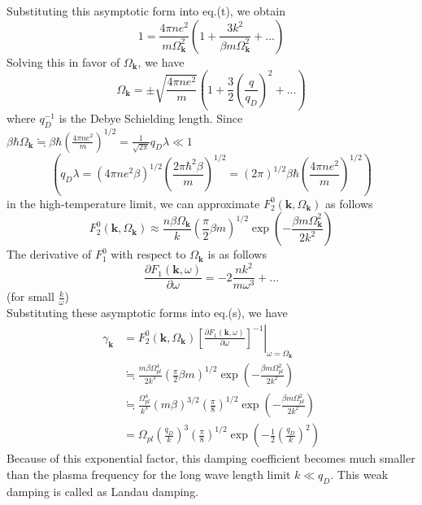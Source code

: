  Substituting this asymptotic form into eq.(t), we obtain
\begin{equation}
1=\frac{4\pi ne^2}{m\Omega_{\mathbf k}^2}\left( 1+\frac{3k^2}{\beta m\Omega_{\mathbf k}^2}+... \right)
\end{equation}
 Solving this in favor of $\Omega_{\mathbf k}$, we have 
\begin{equation}
\Omega_{\mathbf k}=\pm \sqrt{\frac{4\pi ne^2}{m}}\left( 1+\frac{3}{2}\left( \frac{q}{q_D} \right)^2+... \right)
\end{equation}
where $q_D^{-1}$ is the Debye Schielding length.
 Since $\beta\hbar \Omega_{\mathbf k}\fallingdotseq\beta\hbar\left(\frac{4\pi ne^2}{m}\right)^{1/2}=\frac{1}{\sqrt{2\pi}}q_D\lambda\ll 1$
\[
\left( q_D\lambda=(4\pi ne^2\beta)^{1/2}\left( \frac{2\pi\hbar^2\beta}{m} \right)^{1/2}=(2\pi)^{1/2}\beta\hbar\left(\frac{4\pi ne^2}{m}\right)^{1/2} \right)
\]
in the high-temperature limit, we can approximate $F_2^0(\mathbf k,\Omega_{\mathbf k})$ as follows
\begin{equation}
F_2^0(\mathbf k,\Omega_{\mathbf k})\approx \frac{n\beta\Omega_{\mathbf k}}{k} \left( \frac{\pi}{2}\beta m \right)^{1/2} \exp \left( -\frac{\beta m\Omega_{\mathbf k}^2}{2k^2} \right)
\end{equation}
 The derivative of $F_1^0$ with respect to $\Omega_{\mathbf k}$ is as follows
\[
\frac{\partial F_1(\mathbf k,\omega)}{\partial \omega}=-2\frac{nk^2}{m\omega^3}+...
\]
(for small $\frac{k}{\omega}$)\\
 Substituting these asymptotic forms into eq.(s), we have
\begin{equation}
\begin{aligned}
\gamma_{\mathbf k}&=F_2^0(\mathbf k,\Omega_{\mathbf k})\left. \left[ \frac{\partial F_1(\mathbf k,\omega)}{\partial \omega} \right]^{-1}\right|_{\omega=\Omega_{\mathbf k}}\\
&\fallingdotseq\frac{m\beta \Omega_{pl}^4}{2k^3} \left( \frac{\pi}{2}\beta m \right)^{1/2} \exp\left( -\frac{\beta m\Omega_{pl}^2}{2k^2} \right)\\
&\fallingdotseq\frac{\Omega_{pl}^4}{k^3}(m\beta)^{3/2}\left( \frac{\pi}{8} \right)^{1/2}\exp\left( -\frac{\beta m\Omega_{pl}^2}{2k^2} \right)\\
&=\Omega_{pl}\left( \frac{q_D}{k} \right)^3\left( \frac{\pi}{8} \right)^{1/2}\exp\left( -\frac{1}{2}\left( \frac{q_D}{k} \right)^2 \right)
\end{aligned}
\end{equation}
Because of this exponential factor, this damping coefficient becomes much smaller
than the plasma frequency for the long wave length limit $k\ll q_D$.
 This weak damping is called as Landau damping.
